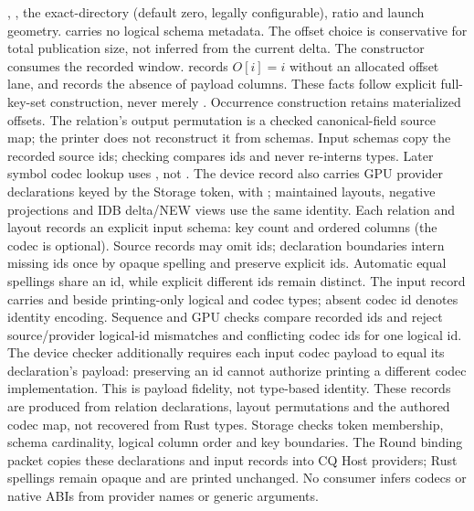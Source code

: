 , ,
the exact-directory  (default zero, legally configurable),
ratio and launch geometry.  carries no
logical schema metadata. The offset choice is conservative for total
publication size, not inferred from the current delta.
The  constructor consumes the recorded
window.  records $O[i]=i$ without an
allocated offset lane, and  records the absence of
payload columns. These facts follow explicit full-key-set construction,
never merely . Occurrence construction retains materialized offsets.
The relation's output permutation is a checked canonical-field source map;
the printer does not reconstruct it from schemas.
Input schemas copy the recorded source ids; checking compares ids and never re-interns types.
Later symbol codec lookup uses , not .
The device record also carries GPU provider declarations keyed by the Storage
token, with ; maintained layouts, negative
projections and IDB delta/NEW views use the same  identity.
Each relation and layout records an explicit input schema: key count and ordered
 columns (the codec is optional).
Source records may omit ids; declaration boundaries intern missing ids once
by opaque spelling and preserve explicit ids. Automatic equal spellings
share an id, while explicit different ids remain distinct. The input record
carries  and
 beside printing-only logical and codec types;
absent codec id denotes identity encoding. Sequence and GPU checks compare
recorded ids and reject source/provider logical-id mismatches and conflicting
codec ids for one logical id.
The device checker additionally requires each input codec payload to equal its
declaration's payload: preserving an id cannot authorize printing a different
codec implementation. This is payload fidelity, not type-based identity.
These records are produced from relation declarations, layout permutations and
the authored codec map, not recovered from Rust types. Storage checks token
membership, schema cardinality, logical column order and key boundaries.
The Round binding packet copies these declarations and input records into CQ
Host providers; Rust spellings remain opaque and are printed unchanged.
No consumer infers codecs or native ABIs from provider names or generic arguments.

